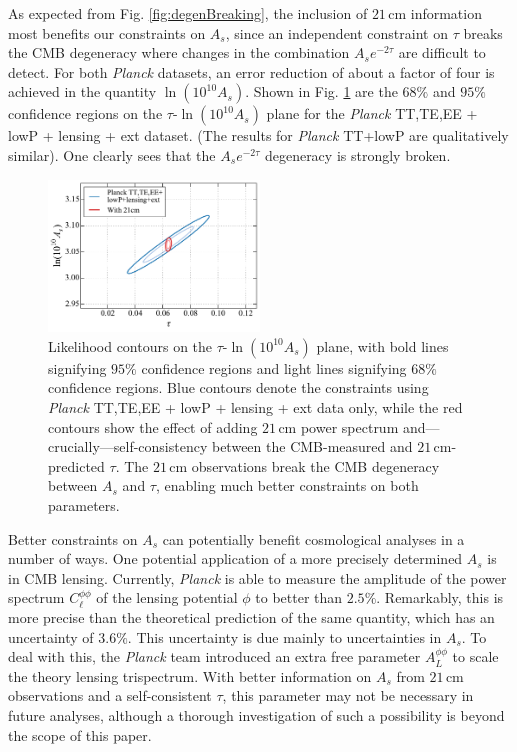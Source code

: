 \documentclass[twocolumn,aps,prd,nofootinbib,showpacs]{revtex4-1}
\begin{document}
As expected from Fig. \ref{fig:degenBreaking}, the inclusion of $21\,\textrm{cm}$ information most benefits our constraints on $A_s$, since an independent constraint on $\tau$ breaks the CMB degeneracy where changes in the combination $A_s e^{-2\tau}$ are difficult to detect. For both \emph{Planck} datasets, an error reduction of about a factor of four is achieved in the quantity $\ln (10^{10} A_s)$. Shown in Fig. \ref{fig:AsTau_w21cm} are the $68\%$ and $95\%$ confidence regions on the $\tau$-$\ln (10^{10} A_s)$ plane for the \emph{Planck} TT,TE,EE + lowP + lensing + ext dataset. (The results for \emph{Planck} TT+lowP are qualitatively similar). One clearly sees that the $A_s e^{-2\tau}$ degeneracy is strongly broken.

\begin{figure}[!]
\centering
\includegraphics[width=0.5\textwidth]{figures/AsTau_w21cm.pdf}
\caption{Likelihood contours on the $\tau$-$\ln (10^{10} A_s)$ plane, with bold lines signifying $95\%$ confidence regions and light lines signifying $68\%$ confidence regions. Blue contours denote the constraints using \emph{Planck} TT,TE,EE + lowP + lensing + ext data only, while the red contours show the effect of adding $21\,\textrm{cm}$ power spectrum and---crucially---self-consistency between the CMB-measured and $21\,\textrm{cm}$-predicted $\tau$. The $21\,\textrm{cm}$ observations break the CMB degeneracy between $A_s$ and $\tau$, enabling much better constraints on both parameters.}
\label{fig:AsTau_w21cm}
\end{figure}

Better constraints on $A_s$ can potentially benefit cosmological analyses in a number of ways. One potential application of a more precisely determined $A_s$ is in CMB lensing. Currently, \emph{Planck} is able to measure the amplitude of the power spectrum $C_\ell^{\phi \phi}$ of the lensing potential $\phi$ to better than $2.5\%$. Remarkably, this is more precise than the theoretical prediction of the same quantity, which has an uncertainty of $3.6\%$. This uncertainty is due mainly to uncertainties in $A_s$. To deal with this, the \emph{Planck} team introduced an extra free parameter $A_L^{\phi \phi}$ to scale the theory lensing trispectrum. With better information on $A_s$ from $21\,\textrm{cm}$ observations and a self-consistent $\tau$, this parameter may not be necessary in future analyses, although a thorough investigation of such a possibility is beyond the scope of this paper.
\end{document}
